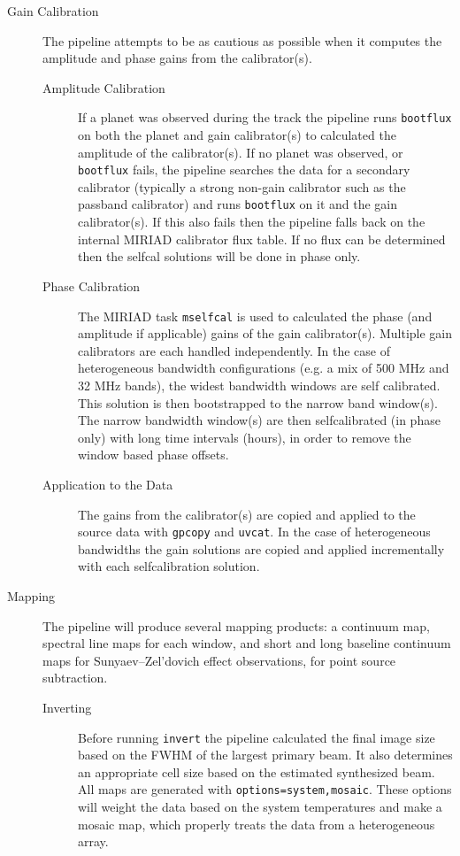 \begin{description}
\begin{description}
\end{description}
\item[Gain Calibration] The pipeline attempts to be as cautious as possible when it computes the amplitude and phase gains from the calibrator(s).
\begin{description}
\item[Amplitude Calibration] If a planet was observed during the track the pipeline runs \verb#bootflux# on both the planet and gain calibrator(s) to calculated the amplitude of the calibrator(s). If no planet was observed, or \verb#bootflux# fails, the pipeline searches the data for a secondary calibrator (typically a strong non-gain calibrator such as the passband calibrator) and runs \verb#bootflux# on it and the gain calibrator(s). If this also fails then the pipeline falls back on the internal MIRIAD calibrator flux table. If no flux can be determined then the selfcal solutions will be done in phase only.
\item[Phase Calibration] The MIRIAD task \verb#mselfcal# is used to calculated the phase (and amplitude if applicable) gains of the gain calibrator(s). Multiple gain calibrators are each handled independently. In the case of heterogeneous bandwidth configurations (e.g. a mix of 500 MHz and 32 MHz bands), the widest bandwidth windows are self calibrated. This solution is then bootstrapped to the narrow band window(s). The narrow bandwidth window(s) are then selfcalibrated (in phase only) with long time intervals (hours), in order to remove the window based phase offsets.
\item[Application to the Data] The gains from the calibrator(s) are copied and applied to the source data with \verb#gpcopy# and \verb#uvcat#. In the case of heterogeneous bandwidths the gain solutions are copied and applied incrementally with each selfcalibration solution. 
\end{description}
\item[Mapping] The pipeline will produce several mapping products: a continuum map, spectral line maps for each window, and short and long baseline continuum maps for Sunyaev–Zel'dovich effect observations, for point source subtraction.
\begin{description}
\item[Inverting] Before running \verb#invert# the pipeline calculated the final image size based on the FWHM of the largest primary beam. It also determines an appropriate cell size based on the estimated synthesized beam. All maps are generated with \verb#options=system,mosaic#. These options will weight the data based on the system temperatures and make a mosaic map, which properly treats the data from a heterogeneous array.

\end{description}
\end{description}
